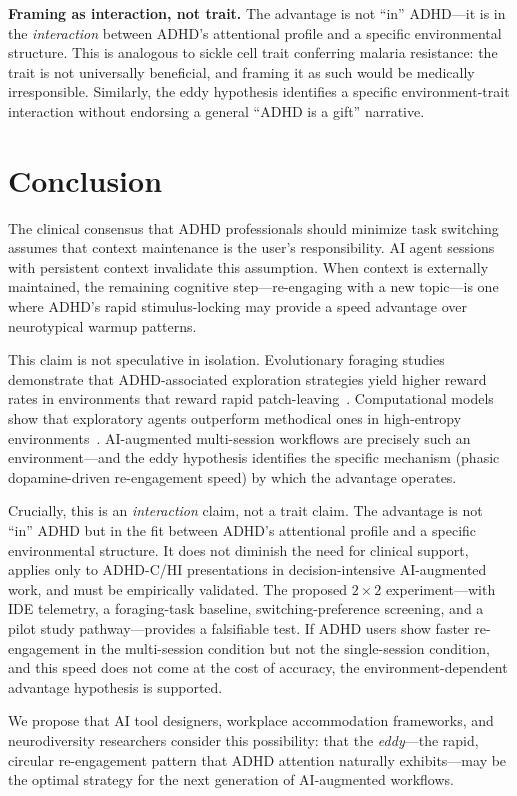 \documentclass[sigconf,nonacm]{acmart}
\begin{document}
\textbf{Framing as interaction, not trait.} The advantage is not ``in'' ADHD---it is in the \emph{interaction} between ADHD's attentional profile and a specific environmental structure. This is analogous to sickle cell trait conferring malaria resistance: the trait is not universally beneficial, and framing it as such would be medically irresponsible. Similarly, the eddy hypothesis identifies a specific environment-trait interaction without endorsing a general ``ADHD is a gift'' narrative.

\section{Conclusion}

The clinical consensus that ADHD professionals should minimize task switching assumes that context maintenance is the user's responsibility. AI agent sessions with persistent context invalidate this assumption. When context is externally maintained, the remaining cognitive step---re-engaging with a new topic---is one where ADHD's rapid stimulus-locking may provide a speed advantage over neurotypical warmup patterns.

This claim is not speculative in isolation. Evolutionary foraging studies demonstrate that ADHD-associated exploration strategies yield higher reward rates in environments that reward rapid patch-leaving~\cite{barack2024}. Computational models show that exploratory agents outperform methodical ones in high-entropy environments~\cite{meredith2025}. AI-augmented multi-session workflows are precisely such an environment---and the eddy hypothesis identifies the specific mechanism (phasic dopamine-driven re-engagement speed) by which the advantage operates.

Crucially, this is an \emph{interaction} claim, not a trait claim. The advantage is not ``in'' ADHD but in the fit between ADHD's attentional profile and a specific environmental structure. It does not diminish the need for clinical support, applies only to ADHD-C/HI presentations in decision-intensive AI-augmented work, and must be empirically validated. The proposed $2 \times 2$ experiment---with IDE telemetry, a foraging-task baseline, switching-preference screening, and a pilot study pathway---provides a falsifiable test. If ADHD users show faster re-engagement in the multi-session condition but not the single-session condition, and this speed does not come at the cost of accuracy, the environment-dependent advantage hypothesis is supported.

We propose that AI tool designers, workplace accommodation frameworks, and neurodiversity researchers consider this possibility: that the \emph{eddy}---the rapid, circular re-engagement pattern that ADHD attention naturally exhibits---may be the optimal strategy for the next generation of AI-augmented workflows.



\end{document}
